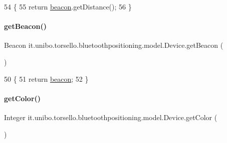 \begin{DoxyCode}
54                                          \{
55         \textcolor{keywordflow}{return} \hyperlink{classit_1_1unibo_1_1torsello_1_1bluetoothpositioning_1_1model_1_1Device_ad5ffce680eb2eb38fc6bb8aee234f155_ad5ffce680eb2eb38fc6bb8aee234f155}{beacon}.getDistance();
56     \}
\end{DoxyCode}
\hypertarget{classit_1_1unibo_1_1torsello_1_1bluetoothpositioning_1_1model_1_1Device_a61b4951f3153550e8006f043eec034c2_a61b4951f3153550e8006f043eec034c2}{}\label{classit_1_1unibo_1_1torsello_1_1bluetoothpositioning_1_1model_1_1Device_a61b4951f3153550e8006f043eec034c2_a61b4951f3153550e8006f043eec034c2} 
\paragraph{\texorpdfstring{get\+Beacon()}{getBeacon()}}
{\footnotesize\ttfamily Beacon it.\+unibo.\+torsello.\+bluetoothpositioning.\+model.\+Device.\+get\+Beacon (\begin{DoxyParamCaption}{ }\end{DoxyParamCaption})}


\begin{DoxyCode}
50                               \{
51         \textcolor{keywordflow}{return} \hyperlink{classit_1_1unibo_1_1torsello_1_1bluetoothpositioning_1_1model_1_1Device_ad5ffce680eb2eb38fc6bb8aee234f155_ad5ffce680eb2eb38fc6bb8aee234f155}{beacon};
52     \}
\end{DoxyCode}
\hypertarget{classit_1_1unibo_1_1torsello_1_1bluetoothpositioning_1_1model_1_1Device_aad4f2885e5ed0279c7e0c6db684de5c3_aad4f2885e5ed0279c7e0c6db684de5c3}{}\label{classit_1_1unibo_1_1torsello_1_1bluetoothpositioning_1_1model_1_1Device_aad4f2885e5ed0279c7e0c6db684de5c3_aad4f2885e5ed0279c7e0c6db684de5c3} 
\paragraph{\texorpdfstring{get\+Color()}{getColor()}}
{\footnotesize\ttfamily Integer it.\+unibo.\+torsello.\+bluetoothpositioning.\+model.\+Device.\+get\+Color (\begin{DoxyParamCaption}{ }\end{DoxyParamCaption})}


